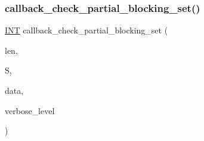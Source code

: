 \subsubsection{\texorpdfstring{callback\+\_\+check\+\_\+partial\+\_\+blocking\+\_\+set()}{callback\_check\_partial\_blocking\_set()}}
{\footnotesize\ttfamily \mbox{\hyperlink{galois_8h_a09fddde158a3a20bd2dcadb609de11dc}{I\+NT}} callback\+\_\+check\+\_\+partial\+\_\+blocking\+\_\+set (\begin{DoxyParamCaption}\item[{\mbox{\hyperlink{galois_8h_a09fddde158a3a20bd2dcadb609de11dc}{I\+NT}}}]{len,  }\item[{\mbox{\hyperlink{galois_8h_a09fddde158a3a20bd2dcadb609de11dc}{I\+NT}} $\ast$}]{S,  }\item[{void $\ast$}]{data,  }\item[{\mbox{\hyperlink{galois_8h_a09fddde158a3a20bd2dcadb609de11dc}{I\+NT}}}]{verbose\+\_\+level }\end{DoxyParamCaption})}

